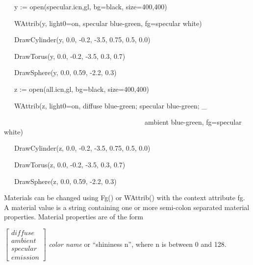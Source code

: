 \documentclass[letterpaper]{article}
\begin{document}
{\bigskip

{\sffamily
\ \ \ y := open({\textquotedbl}specular.icn{\textquotedbl},{\textquotedbl}gl{\textquotedbl},
{\textquotedbl}bg=black{\textquotedbl}, {\textquotedbl}size=400,400{\textquotedbl})}

{\sffamily
\ \ \ WAttrib(y, {\textquotedbl}light0=on, specular blue-green{\textquotedbl}, {\textquotedbl}fg=specular
white{\textquotedbl})}

{\sffamily
\ \ \ DrawCylinder(y, 0.0, -0.2, -3.5, 0.75, 0.5, 0.0)}

{\sffamily
\ \ \ DrawTorus(y, 0.0, -0.2, -3.5, 0.3, 0.7)}

{\sffamily
\ \ \ DrawSphere(y, 0.0, 0.59, -2.2, 0.3)}


\bigskip

{\sffamily
\ \ \ z := open({\textquotedbl}all.icn{\textquotedbl},{\textquotedbl}gl{\textquotedbl},
{\textquotedbl}bg=black{\textquotedbl}, {\textquotedbl}size=400,400{\textquotedbl})}

{\sffamily
\ \ \ WAttrib(z, {\textquotedbl}light0=on, diffuse blue-green; specular blue-green; \_}

{\sffamily
\ \ \ \ \ \ \ \ \ \ \ \ \ \ \ \ \ \ \ \ \ \ \ \ \ \ \ \ \ \ \ \ \ \ \ \ \ \ \ \ \ ambient blue-green{\textquotedbl},
{\textquotedbl}fg=specular white{\textquotedbl})}

{\sffamily
\ \ \ DrawCylinder(z, 0.0, -0.2, -3.5, 0.75, 0.5, 0.0)}

{\sffamily
\ \ \ DrawTorus(z, 0.0, -0.2, -3.5, 0.3, 0.7)}

{\sffamily
\ \ \ DrawSphere(z, 0.0, 0.59, -2.2, 0.3)}


\bigskip

Materials can be changed using \textsf{Fg()} or \textsf{WAttrib()}
with the context attribute \textsf{fg}. A material value is a string
containing one or more semi-colon separated material
properties. Material properties are of the form

\bigskip

$\left[
\begin{array}{l}
diffuse\\ambient\\specular\\emission
\end{array}
\right]$ \textsf{\textit{color name}} or \textsf{``shininess n''},
where \textsf{n} is between \textsf{0} and \textsf{128}.

}
\end{document}

